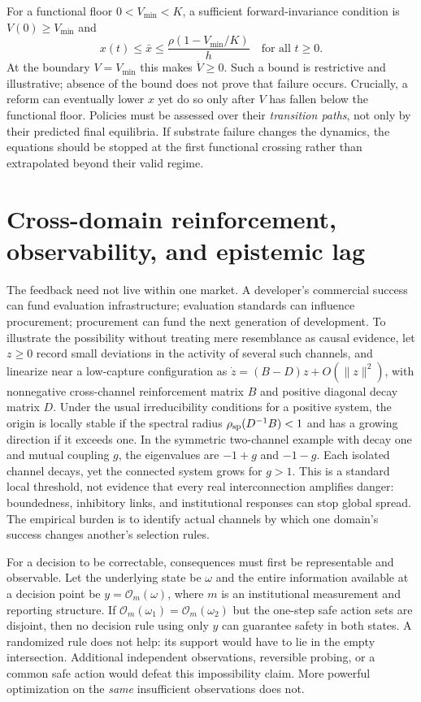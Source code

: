 \documentclass[11pt]{article}
\begin{document}
For a functional floor $0<V_{\min}<K$, a sufficient forward-invariance condition is $V(0)\geq V_{\min}$ and
\begin{equation}\label{eq:viability}
x(t)\leq\bar x\leq\frac{\rho(1-V_{\min}/K)}{h}\quad\text{for all }t\geq0.
\end{equation}
At the boundary $V=V_{\min}$ this makes $\dot V\geq0$. Such a bound is restrictive and illustrative; absence of the bound does not prove that failure occurs. Crucially, a reform can eventually lower $x$ yet do so only after $V$ has fallen below the functional floor. Policies must be assessed over their \emph{transition paths}, not only by their predicted final equilibria. If substrate failure changes the dynamics, the equations should be stopped at the first functional crossing rather than extrapolated beyond their valid regime.

\section{Cross-domain reinforcement, observability, and epistemic lag}

The feedback need not live within one market. A developer's commercial success can fund evaluation infrastructure; evaluation standards can influence procurement; procurement can fund the next generation of development. To illustrate the possibility without treating mere resemblance as causal evidence, let $z\geq0$ record small deviations in the activity of several such channels, and linearize near a low-capture configuration as $\dot z=(B-D)z+O(\|z\|^2)$, with nonnegative cross-channel reinforcement matrix $B$ and positive diagonal decay matrix $D$. Under the usual irreducibility conditions for a positive system, the origin is locally stable if the spectral radius $\rho_{\rm sp}(D^{-1}B)<1$ and has a growing direction if it exceeds one. In the symmetric two-channel example with decay one and mutual coupling $g$, the eigenvalues are $-1+g$ and $-1-g$. Each isolated channel decays, yet the connected system grows for $g>1$. This is a standard local threshold, not evidence that every real interconnection amplifies danger: boundedness, inhibitory links, and institutional responses can stop global spread. The empirical burden is to identify actual channels by which one domain's success changes another's selection rules.

For a decision to be correctable, consequences must first be representable and observable. Let the underlying state be $\omega$ and the entire information available at a decision point be $y=\mathcal O_m(\omega)$, where $m$ is an institutional measurement and reporting structure. If $\mathcal O_m(\omega_1)=\mathcal O_m(\omega_2)$ but the one-step safe action sets are disjoint, then no decision rule using only $y$ can guarantee safety in both states. A randomized rule does not help: its support would have to lie in the empty intersection. Additional independent observations, reversible probing, or a common safe action would defeat this impossibility claim. More powerful optimization on the \emph{same} insufficient observations does not.
\end{document}
